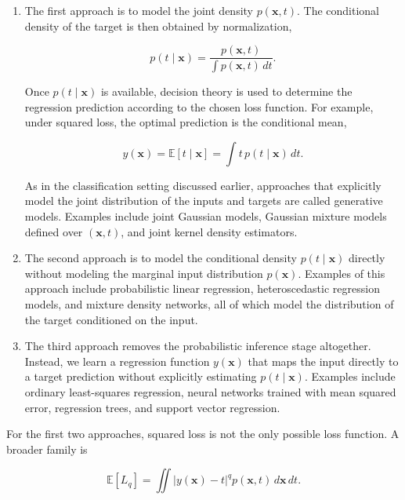 \documentclass[10pt,twocolumn]{memoir}
\begin{document}
\begin{enumerate}

\item The first approach is to model the joint density $p(\mathbf{x},t)$. The conditional density of the target is then obtained by normalization,

\begin{equation}
    p(t\mid\mathbf{x}) = \frac{p(\mathbf{x},t)}{\int p(\mathbf{x},t)\,dt}.
\end{equation}

Once $p(t\mid\mathbf{x})$ is available, decision theory is used to determine the regression prediction according to the chosen loss function. For example, under squared loss, the optimal prediction is the conditional mean,

\begin{equation}
    y(\mathbf{x}) = \mathbb{E}[t\mid\mathbf{x}] = \int t\,p(t\mid\mathbf{x})\,dt.
\end{equation}

As in the classification setting discussed earlier, approaches that explicitly model the joint distribution of the inputs and targets are called generative models. Examples include joint Gaussian models, Gaussian mixture models defined over $(\mathbf{x},t)$, and joint kernel density estimators.

\item The second approach is to model the conditional density $p(t\mid\mathbf{x})$ directly without modeling the marginal input distribution $p(\mathbf{x})$. Examples of this approach include probabilistic linear regression, heteroscedastic regression models, and mixture density networks, all of which model the distribution of the target conditioned on the input.

\item The third approach removes the probabilistic inference stage altogether. Instead, we learn a regression function $y(\mathbf{x})$ that maps the input directly to a target prediction without explicitly estimating $p(t\mid\mathbf{x})$. Examples include ordinary least-squares regression, neural networks trained with mean squared error, regression trees, and support vector regression.

\end{enumerate}

For the first two approaches, squared loss is not the only possible loss function. A broader family is

\begin{equation}
    \mathbb{E}[L_q] = \iint\left|y(\mathbf{x})-t\right|^q p(\mathbf{x},t)\,d\mathbf{x}\,dt.
\end{equation}
\end{document}

